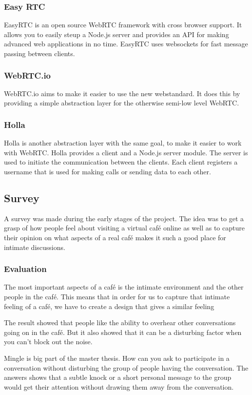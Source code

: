 \documentclass[12pt, titlepage]{article}
\begin{document}
\subsubsection{Easy RTC}
EasyRTC is an open source WebRTC framework with cross browser support. It allows you to easily steup a Node.js server and provides an API for making advanced web applications in no time. EasyRTC uses websockets for fast message passing between clients.
\subsubsection{WebRTC.io}
WebRTC.io aims to make it easier to use the new webstandard. It does this by providing a simple abstraction layer for the otherwise semi-low level WebRTC.
\subsubsection{Holla}
Holla is another abstraction layer with the same goal, to make it easier to work with WebRTC. Holla provides a client and a Node.js server module. The server is used to initiate the communication between the clients. Each client registers a username that is used for making calls or sending data to each other.
\subsection{Survey}
A survey was made during the early stages of the project. The idea was to get a grasp of how people feel about visiting a virtual café online as well as to capture their opinion on what aspects of a real café makes it such a good place for intimate discussions.
\subsubsection{Evaluation}
The most important aspects of a café is the intimate environment and the other people in the café. This means that in order for us to capture that intimate feeling of a café, we have to create a design that gives a similar feeling

The result showed that people like the ability to overhear other conversations going on in the café. But it also showed that it can be a disturbing factor when you can't block out the noise.

Mingle is big part of the master thesis. How can you ask to participate in a conversation without disturbing the group of people having the conversation. The answers shows that a subtle knock or a short personal message to the group would get their attention without drawing them away from the conversation.
\end{document}
